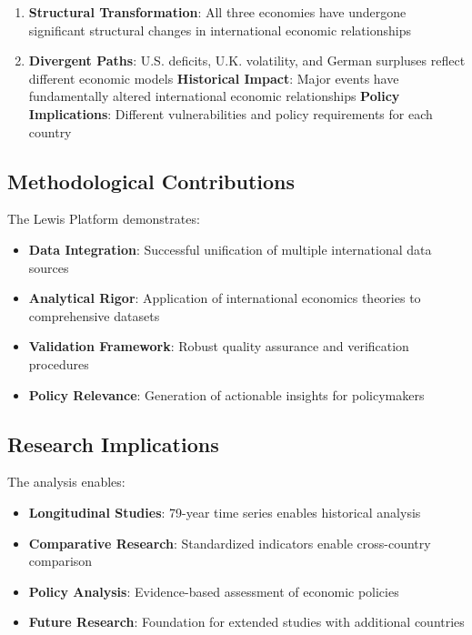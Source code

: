 \documentclass[11pt,a4paper]{article}
\begin{document}
\begin{enumerate}
    \item \textbf{Structural Transformation}: All three economies have undergone significant structural changes in international economic relationships
    \item \textbf{Divergent Paths}: U.S. deficits, U.K. volatility, and German surpluses reflect different economic models
    \textbf{Historical Impact}: Major events have fundamentally altered international economic relationships
    \textbf{Policy Implications}: Different vulnerabilities and policy requirements for each country
\end{enumerate}

\subsection{Methodological Contributions}
The Lewis Platform demonstrates:

\begin{itemize}
    \item \textbf{Data Integration}: Successful unification of multiple international data sources
    \item \textbf{Analytical Rigor}: Application of international economics theories to comprehensive datasets
    \item \textbf{Validation Framework}: Robust quality assurance and verification procedures
    \item \textbf{Policy Relevance}: Generation of actionable insights for policymakers
\end{itemize}

\subsection{Research Implications}
The analysis enables:

\begin{itemize}
    \item \textbf{Longitudinal Studies}: 79-year time series enables historical analysis
    \item \textbf{Comparative Research}: Standardized indicators enable cross-country comparison
    \item \textbf{Policy Analysis}: Evidence-based assessment of economic policies
    \item \textbf{Future Research}: Foundation for extended studies with additional countries
\end{itemize}
\end{document}
